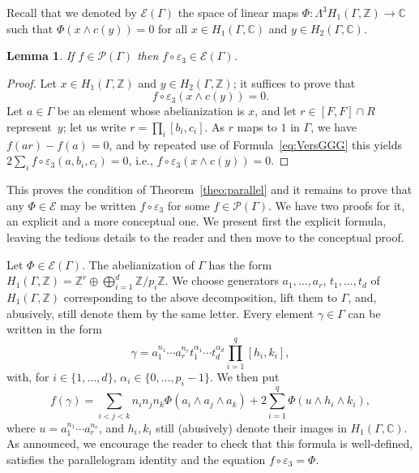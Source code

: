 \documentclass[11pt]{article}
\newcommand{\ie}{i.e.,\xspace}
\let\mathcal\mathscr
\newtheorem{lemma}[theorem]{Lemma}
\theoremstyle{definition}
\newcommand{\ZZ}{\mathbb{Z}}
\newcommand{\CC}{\mathbb{C}}
\begin{document}
Recall that we denoted by $\mathcal{E}(\Gamma)$ the space of linear maps
$\Phi:\Lambda^3 H_1(\Gamma,\ZZ)\to \CC$ such that $\Phi(x\wedge c(y))=0$
for all $x\in H_1(\Gamma,\CC)$ and $y\in H_2(\Gamma,\CC)$.

\begin{lemma}\label{H2necessaire}
If $f\in \mathcal{P}(\Gamma)$ then
$f\circ\varepsilon_3\in \mathcal{E}(\Gamma)$.
\end{lemma}
\begin{proof}
Let $x\!\in\!H_1(\Gamma,\ZZ)$ and $y\!\in\!H_2(\Gamma,\ZZ)$; it suffices to prove
that
\[
f\circ\varepsilon_3(x\wedge c(y))=0.
\]
Let $a\in\Gamma$ be an element
whose abelianization is $x$, and let $r\in[F,F]\cap R$ represent~$y$; let us write $r=\prod_i[b_i,c_i]$. As $r$ maps to $1$ in $\Gamma$,
we have $f(ar)-f(a)=0$, and by repeated use of Formula~\eqref{eq:VersGGG}
this yields $2\sum_i f\circ\varepsilon_3(a,b_i,c_i)=0$, \ie 
\hbox{$f\circ\varepsilon_3(x\wedge c(y))=0$}.
\end{proof}

This proves the condition of Theorem~\ref{theo:parallel} and it remains to
prove that any $\Phi\in \mathcal{E}$ may be written $f\circ\varepsilon_3$
for some $f\in\mathcal{P}(\Gamma)$. We have two proofs for it, an explicit
and a more conceptual one. We present first the explicit formula, leaving
the tedious details to the reader and then move to the conceptual proof.

Let $\Phi\in\mathcal{E}(\Gamma)$. The abelianization of $\Gamma$ has the form
$H_1(\Gamma,\ZZ)=\ZZ^r\oplus \bigoplus_{i=1}^d \ZZ/p_i\ZZ.$ We choose generators
$a_1,\ldots,a_r$, $t_1,\ldots,t_d$ of $H_1(\Gamma,\ZZ)$ corresponding to the
above decomposition, lift them to $\Gamma$, and, abusively, still denote them
by the same letter. Every element $\gamma\in\Gamma$ can be written in the form
\begin{equation}\label{ecrireg}
\gamma=a_1^{n_1}\cdots a_r^{n_r}t_1^{\alpha_1}\cdots
t_d^{\alpha_d}\prod_{i=1}^q[h_i,k_i],
\end{equation}
with, for $i\in\{1,\ldots,d\}$, $\alpha_i\in\{0,\ldots,p_i-1\}$. We then put
\begin{equation}
f(\gamma)= \sum_{i<j<k} n_in_jn_k\Phi(a_i\wedge a_j\wedge a_k)
+2\sum_{i=1}^q\Phi(u\wedge h_i\wedge k_i),
\end{equation}
where $u=a_1^{n_1}\cdots a_r^{n_r}$, and $h_i,k_i$ still (abusively) denote
their images in $H_1(\Gamma,\CC)$. As announced, we encourage the reader to
check that this formula is well-defined, satisfies the parallelogram
identity and the equation $f\circ\varepsilon_3=\Phi$.
\end{document}
